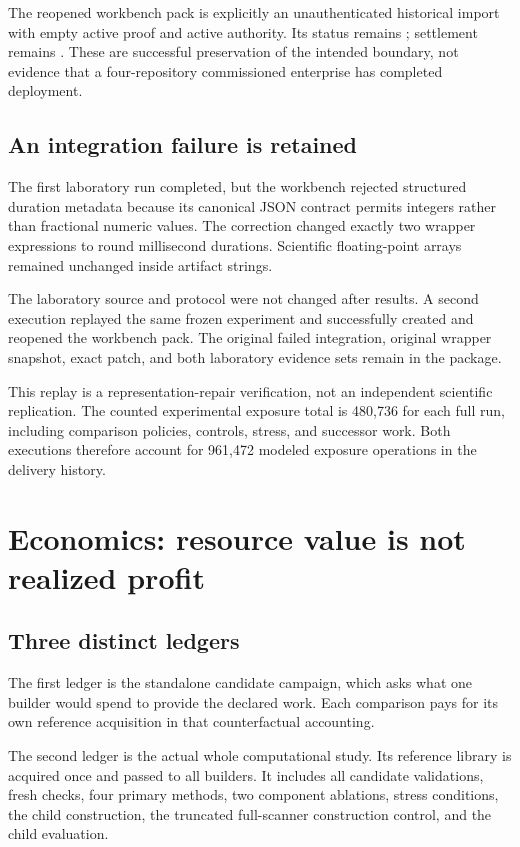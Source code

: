 \documentclass[11pt,a4paper]{article}
\newcommand{\artifact}[1]{\texttt{\detokenize{#1}}}
\begin{document}
The reopened workbench pack is explicitly an unauthenticated historical import with empty active proof and active authority. Its status remains \artifact{HOLD}; settlement remains \artifact{NOT_CONNECTED}. These are successful preservation of the intended boundary, not evidence that a four-repository commissioned enterprise has completed deployment.

\subsection{An integration failure is retained}

The first laboratory run completed, but the workbench rejected structured duration metadata because its canonical JSON contract permits integers rather than fractional numeric values. The correction changed exactly two wrapper expressions to round millisecond durations. Scientific floating-point arrays remained unchanged inside artifact strings.

The laboratory source and protocol were not changed after results. A second execution replayed the same frozen experiment and successfully created and reopened the workbench pack. The original failed integration, original wrapper snapshot, exact patch, and both laboratory evidence sets remain in the package.

This replay is a representation-repair verification, not an independent scientific replication. The counted experimental exposure total is 480,736 for each full run, including comparison policies, controls, stress, and successor work. Both executions therefore account for 961,472 modeled exposure operations in the delivery history.

\section{Economics: resource value is not realized profit}

\subsection{Three distinct ledgers}

The first ledger is the standalone candidate campaign, which asks what one builder would spend to provide the declared work. Each comparison pays for its own reference acquisition in that counterfactual accounting.

The second ledger is the actual whole computational study. Its reference library is acquired once and passed to all builders. It includes all candidate validations, fresh checks, four primary methods, two component ablations, stress conditions, the child construction, the truncated full-scanner construction control, and the child evaluation.
\end{document}
